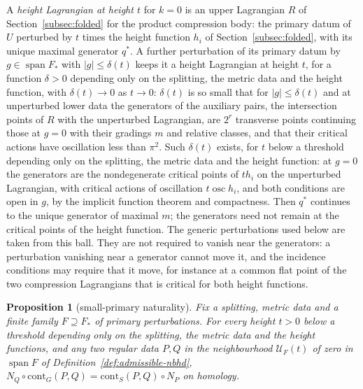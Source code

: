 \documentclass[11pt]{amsart}
\newtheorem{proposition}[theorem]{Proposition}
\theoremstyle{definition}
\theoremstyle{remark}
\theoremstyle{plain}
\numberwithin{equation}{section}
\begin{document}
A \emph{height Lagrangian at height $t$} for $k=0$ is an upper Lagrangian $R$ of
Section~\ref{subsec:folded} for the product compression body: the primary datum
of $U$ perturbed by $t$ times the height function $h_i$ of Section~\ref{subsec:folded}, with
its unique maximal generator $q^*$. A further perturbation of its primary datum by
$g\in\operatorname{span}F_*$ with $|g|\le\delta(t)$ keeps it a height Lagrangian at height $t$,
for a function $\delta>0$ depending only on the splitting, the metric data and the height
function, with $\delta(t)\to0$ as $t\to0$: $\delta(t)$ is so small that for $|g|\le\delta(t)$
and at unperturbed lower data the generators of the auxiliary pairs, the intersection points of
$R$ with the unperturbed Lagrangian, are $2^r$ transverse points continuing those at $g=0$ with
their gradings $m$ and relative classes, and that their critical actions have oscillation less
than $\pi^2$. Such $\delta(t)$ exists, for $t$ below a threshold depending only on the splitting,
the metric data and the height function: at $g=0$ the generators are the nondegenerate critical
points of $th_i$ on the unperturbed Lagrangian, with critical actions of oscillation
$t\operatorname{osc}h_i$, and both conditions are open in $g$, by the implicit function theorem
and compactness. Then $q^*$ continues to the unique generator of maximal $m$; the generators
need not remain at the critical points of the height function. The generic perturbations used below are taken from
this ball. They are not required to vanish near the
generators: a perturbation vanishing near a generator cannot move it, and the incidence
conditions may require that it move, for instance at a common flat point of the two
compression Lagrangians that is critical for both height functions.

\begin{proposition}[small-primary naturality]\label{prop:small-primary}
Fix a splitting, metric data and a finite family $F\supseteq F_*$ of primary perturbations.
For every height $t>0$ below a threshold depending only on the splitting, the metric data and
the height functions, and any two regular data $P,Q$ in the neighbourhood
$\mathcal U_F(t)$ of zero in $\operatorname{span}F$ of Definition~\ref{def:admissible-nbhd},
$N_Q\circ \mathrm{cont}_G(P,Q)=\mathrm{cont}_S(P,Q)\circ N_P$ on homology.
\end{proposition}
\end{document}
